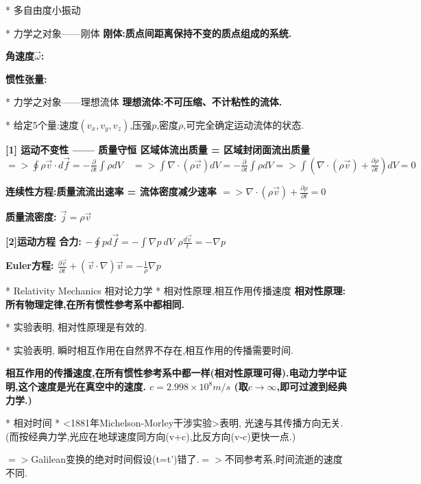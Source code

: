         * 多自由度小振动


    * 力学之对象——刚体
        \bf{刚体}:质点间距离保持不变的质点组成的系统.
        
        \bf{角速度$\vec \omega$}:
        
        \bf{惯性张量}:
    
    
    
    * 力学之对象——理想流体
        \bf{理想流体}:不可压缩、不计粘性的流体.
        
        * 给定5个量:速度$(v_x,v_y,v_z)$,压强$p$,密度$\rho$,可完全确定运动流体的状态.
        
        \bf{[1] 运动不变性 —— 质量守恒}
            区域体流出质量 = 区域封闭面流出质量
            $=> \oint \rho \vec v \cdot d \vec f = -\frac{∂}{∂ t}\int \rho dV \quad => \int \nabla \cdot (\rho \vec v) dV  = -\frac{∂}{∂ t}\int \rho dV =>  \int (\nabla \cdot (\rho \vec v) + \frac{∂ \rho}{∂ t}) dV  = 0$
        
        \bf{连续性方程}:质量流流出速率 = 流体密度减少速率
            $=> \nabla \cdot (\rho \vec v) +  \frac{∂ \rho}{∂ t} = 0$
        
        \bf{质量流密度}:
            $\vec j = \rho \vec v$
        
        \bf{[2]运动方程}
            合力:
            $-\oint p d \vec f = -\int \nabla p\ dV$
            $\rho \frac{d \vec v}{t} = -\nabla p$
        
        \bf{Euler方程}:
            $\frac{∂ \vec v}{∂ t} + (\vec v \cdot \nabla)\vec v = - \frac{1}{\rho}\nabla p$


* Relativity Mechanics 相对论力学
    * 相对性原理,相互作用传播速度
        \bf{相对性原理}: 所有物理定律,在所有惯性参考系中都相同.
        
        * 实验表明, 相对性原理是有效的.
        
        * 实验表明, 瞬时相互作用在自然界不存在,相互作用的传播需要时间.
        
        \bf{相互作用的传播速度},在所有惯性参考系中都一样(相对性原理可得).\quad 电动力学中证明,这个速度是光在真空中的速度.
            $c = 2.998 \times 10^8 m/s$
            (取$c\to \infty$,即可过渡到经典力学.)


    * 相对时间
        * <1881年Michelson-Morley干涉实验>表明, 光速与其传播方向无关. (而按经典力学,光应在地球速度同方向(v+c),比反方向(v-c)更快一点.)
        
        $=>$Galilean变换的绝对时间假设(t=t')错了.\quad  $=>$不同参考系,时间流逝的速度不同.
        
